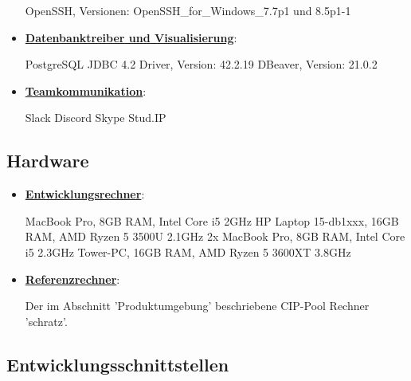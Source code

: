 \documentclass{article}
\begin{document}
\begin{itemize}
\begin{flushleft}
OpenSSH, Versionen: OpenSSH\_for\_Windows\_7.7p1 und 8.5p1-1\\
\end{flushleft}
\item \underline{\textbf{Datenbanktreiber und Visualisierung}}: 
\begin{flushleft}
PostgreSQL JDBC 4.2 Driver, Version: 42.2.19 \linebreak
DBeaver, Version: 21.0.2 \\
\end{flushleft}
\item \underline{\textbf{Teamkommunikation}}: 
\begin{flushleft}
Slack \linebreak
Discord \linebreak
Skype \linebreak
Stud.IP \linebreak
\end{flushleft}
\end{itemize}

\subsection{Hardware}

\begin{itemize}
\item \underline{\textbf{Entwicklungsrechner}}: 
\begin{flushleft}
MacBook Pro, 8GB RAM, Intel Core i5 2GHz  \linebreak
HP Laptop 15-db1xxx, 16GB RAM, AMD Ryzen 5 3500U 2.1GHz \linebreak
2x MacBook Pro, 8GB RAM, Intel Core i5 2.3GHz \linebreak
Tower-PC, 16GB RAM, AMD Ryzen 5 3600XT 3.8GHz \linebreak
\end{flushleft}
\item \underline{\textbf{Referenzrechner}}:
\begin{flushleft}
Der im Abschnitt 'Produktumgebung' beschriebene CIP-Pool Rechner 'schratz'.
\end{flushleft}
\end{itemize}

\subsection{Entwicklungsschnittstellen}
\end{document}
